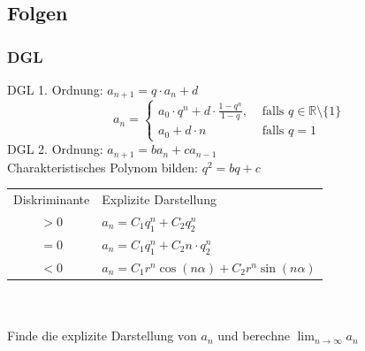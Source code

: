 \documentclass[11pt, a4paper]{article}
\begin{document}
\subsection{Folgen}
\subsubsection{DGL}
DGL 1. Ordnung: $a_{n+1} = q \cdot a_n + d$
\[a_n = \begin{cases}
	a_0 \cdot q^n + d \cdot \frac{1-q^n}{1-q}, &\text{ falls } q \in \mathbb{R} \setminus \{1\} \\
	a_0 + d \cdot n &\text{ falls } q=1
\end{cases}\]
DGL 2. Ordnung: $a_{n+1} = b a_n + c a_{n-1}$ \\
Charakteristisches Polynom bilden: $q^2 = bq+c$ \\
\begin{tabular}{cl}
	Diskriminante & Explizite Darstellung \\
	$>0$ & $a_n = C_1 q_1^n + C_2 q_2^n$ \\
	$=0$ & $a_n = C_1 q_1^n + C_2 n \cdot q_2^n$ \\
	$<0$ & $a_n = C_1 r^n \cos(n\alpha) + C_2 r^n \sin(n\alpha)$ \\
\end{tabular} \\ \\
Finde die explizite Darstellung von $a_n$ und berechne $\lim_{n \rightarrow \infty} a_n$
\end{document}

